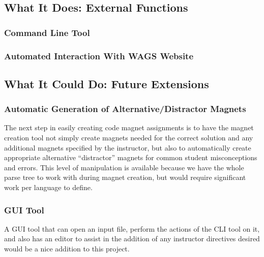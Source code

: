 \documentclass[letter,10pt]{article}
\begin{document}


\subsection{What It Does: External Functions}

\subsubsection{Command Line Tool}


\subsubsection{Automated Interaction With WAGS Website}



\subsection{What It Could Do: Future Extensions}

\subsubsection{Automatic Generation of Alternative/Distractor Magnets}

The next step in easily creating code magnet assignments is to have the 
magnet creation tool not simply create magnets needed for the correct 
solution and any additional magnets specified by the instructor, but 
also to automatically create appropriate alternative ``distractor'' 
magnets for common student misconceptions and errors. This level of 
manipulation is available because we have the whole parse tree to work 
with during magnet creation, but would require significant work per 
language to define.

\subsubsection{GUI Tool}

A GUI tool that can open an input file, perform the actions of the CLI 
tool on it, and also has an editor to assist in the addition of any 
instructor directives desired would be a nice addition to this project.
\end{document}
